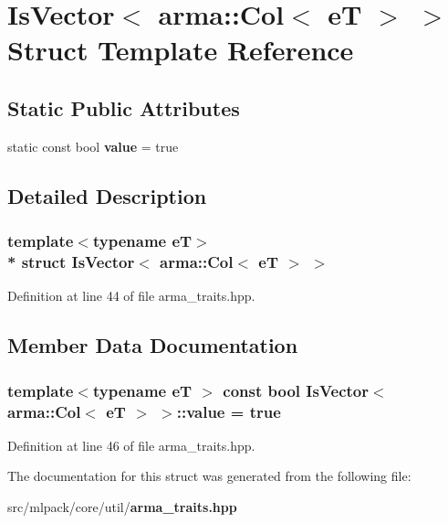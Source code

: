 \section{Is\+Vector$<$ arma\+:\+:Col$<$ eT $>$ $>$ Struct Template Reference}
\label{structIsVector_3_01arma_1_1Col_3_01eT_01_4_01_4}
\subsection*{Static Public Attributes}
\begin{DoxyCompactItemize}
\item 
static const bool {\bf value} = true
\end{DoxyCompactItemize}


\subsection{Detailed Description}
\subsubsection*{template$<$typename eT$>$\\*
struct Is\+Vector$<$ arma\+::\+Col$<$ e\+T $>$ $>$}



Definition at line 44 of file arma\+\_\+traits.\+hpp.



\subsection{Member Data Documentation}
\subsubsection[{value}]{\setlength{\rightskip}{0pt plus 5cm}template$<$typename eT $>$ const bool {\bf Is\+Vector}$<$ arma\+::\+Col$<$ eT $>$ $>$\+::value = true\hspace{0.3cm}{\ttfamily [static]}}\label{structIsVector_3_01arma_1_1Col_3_01eT_01_4_01_4_acf47df24029079ca1d890c32c148814d}


Definition at line 46 of file arma\+\_\+traits.\+hpp.



The documentation for this struct was generated from the following file\+:\begin{DoxyCompactItemize}
\item 
src/mlpack/core/util/{\bf arma\+\_\+traits.\+hpp}\end{DoxyCompactItemize}
